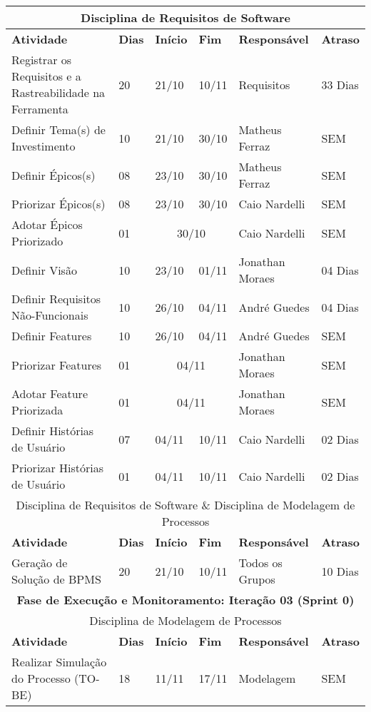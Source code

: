 \begin{center}
	\begin{tabular}{|m{10cm}|m{1cm}|m{1cm}|m{1cm}|m{4cm}|m{2cm}|}
	\hline
	\multicolumn{6}{|c|}{Disciplina de Requisitos de Software} \\
	\hline
	\textbf{Atividade} & \textbf{Dias} & \textbf{Início} & \textbf{Fim} & \textbf{Responsável} & \textbf{Atraso} \\ \hline
	Registrar os Requisitos e a Rastreabilidade na Ferramenta & 20 & 21/10 & 10/11 & Requisitos & 33 Dias \\ \hline
	Definir Tema(s) de Investimento & 10 & 21/10 & 30/10 & Matheus Ferraz & SEM \\ \hline
	Definir Épicos(s) & 08 & 23/10 & 30/10 & Matheus Ferraz & SEM \\ \hline
	Priorizar Épicos(s) & 08 & 23/10 & 30/10 & Caio Nardelli & SEM \\ \hline
	Adotar Épicos Priorizado & 01 & \multicolumn{2}{c|}{30/10} & Caio Nardelli & SEM \\ \hline
	Definir Visão & 10 & 23/10 & 01/11 & Jonathan Moraes & 04 Dias \\ \hline
	Definir Requisitos Não-Funcionais & 10 & 26/10 & 04/11 & André Guedes & 04 Dias \\ \hline
	Definir Features & 10 & 26/10 & 04/11 & André Guedes & SEM \\ \hline
	Priorizar Features & 01 & \multicolumn{2}{c|}{04/11} & Jonathan Moraes & SEM \\ \hline
	Adotar Feature Priorizada & 01 & \multicolumn{2}{c|}{04/11} & Jonathan Moraes & SEM \\ \hline
	Definir Histórias de Usuário & 07 & 04/11 & 10/11 & Caio Nardelli & 02 Dias \\ \hline
	Priorizar Histórias de Usuário & 01 & 04/11 & 10/11 & Caio Nardelli & 02 Dias \\ \hline
	\multicolumn{6}{|c|}{Disciplina de Requisitos de Software \& Disciplina de Modelagem de Processos} \\ \hline
	\textbf{Atividade} & \textbf{Dias} & \textbf{Início} & \textbf{Fim} & \textbf{Responsável} & \textbf{Atraso} \\ \hline
	Geração de Solução de BPMS & 20 & 21/10 & 10/11 & Todos os Grupos & 10 Dias \\ \hline
	\multicolumn{6}{|c|}{\textbf{Fase de Execução e Monitoramento: Iteração 03 (Sprint 0)}} \\
	\hline
	\multicolumn{6}{|c|}{Disciplina de Modelagem de Processos} \\
	\hline
	\textbf{Atividade} & \textbf{Dias} & \textbf{Início} & \textbf{Fim} & \textbf{Responsável} & \textbf{Atraso} \\ \hline
	Realizar Simulação do Processo (TO-BE) & 18 & 11/11 & 17/11 & Modelagem & SEM \\ \hline
	\end{tabular}
\end{center}

